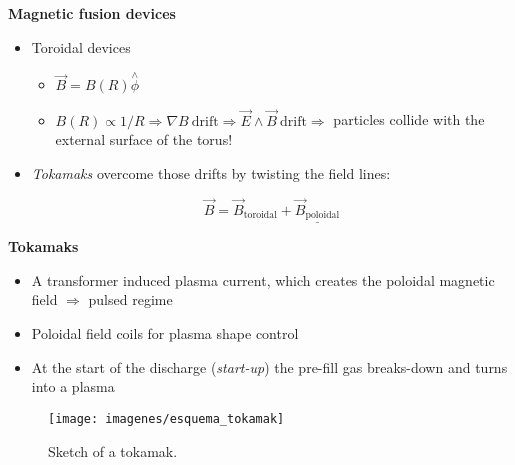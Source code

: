 \documentclass[10pt]{beamer}
\begin{document}
\begin{frame}{\bf Magnetic fusion devices}

\begin{minipage}{0.55\textwidth}

\begin{itemize}
\item Toroidal devices

\begin{itemize}
\item $\vec{B}=B(R) \stackrel{\wedge}{\phi}$
\item $B(R) \propto 1/R \Rightarrow \nabla B \ \text{drift} \Rightarrow \vec{E} \wedge \vec{B} \ \text{drift} \Rightarrow$ particles collide with the external surface of the torus!

\end{itemize}

\item \textit{Tokamaks} overcome those drifts by twisting the field lines:

$$\vec{B}=\vec{B}_\text{toroidal}+\underline{\vec{B}_\text{poloidal}}$$

\end{itemize}
\end{minipage}
%
\hfill
%
\begin{minipage}{0.4\textwidth}
\begin{figure}[htbp]
\centering
{}
{}
\end{figure}
\end{minipage}

\end{frame}





\begin{frame}{\bf Tokamaks}

\begin{itemize}

\item A transformer induced plasma current, which creates the poloidal magnetic field $\Rightarrow$ pulsed regime
\item Poloidal field coils for plasma shape control
\item At the start of the discharge (\textit{start-up}) the pre-fill gas breaks-down and turns into a plasma
\end{itemize}

\begin{figure}[htbp]
\centering
\texttt{[image: imagenes/esquema\_tokamak]}
\caption{Sketch of a tokamak.}
\label{def aspect ratio}
\end{figure}
\end{frame}
\end{document}
